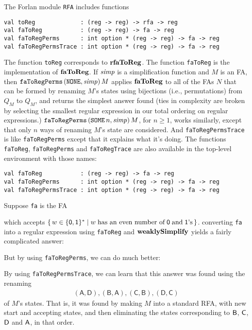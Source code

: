 The Forlan module \texttt{RFA} includes functions
\begin{verbatim}
val toReg             : (reg -> reg) -> rfa -> reg
val faToReg           : (reg -> reg) -> fa -> reg
val faToRegPerms      : int option * (reg -> reg) -> fa -> reg
val faToRegPermsTrace : int option * (reg -> reg) -> fa -> reg
\end{verbatim}
The function \texttt{toReg} corresponds to $\mathbf{rfaToReg}$.
The function \texttt{faToReg} is the implementation of $\mathbf{faToReg}$.  If
${\it simp}$ is a simplification function and $M$ is an FA, then
$\mathtt{faToRegPerms}\,(\mathtt{NONE},{\it simp})\,M$ applies $\mathbf{faToReg}$
to all of the FAs $N$ that can be formed by renaming $M$'s states
using bijections (i.e., permutations) from $Q_M$ to $Q_M$, and returns
the simplest answer found (ties in complexity are broken by selecting
the smallest regular expression in our total ordering on regular
expressions.)
$\mathtt{faToRegPerms}\,(\mathtt{SOME}\,n,{\it simp})\,M$, for $n\geq 1$,
works similarly, except that only $n$ ways of renaming $M$'s state are
considered.  And \texttt{faToRegPermsTrace} is like
\texttt{faToRegPerms} except that it explains what it's doing.  The
functions \texttt{faToReg}, \texttt{faToRegPerms} and
\texttt{faToRegTrace} are also available in the top-level environment
with those names:
\begin{verbatim}
val faToReg           : (reg -> reg) -> fa -> reg
val faToRegPerms      : int option * (reg -> reg) -> fa -> reg
val faToRegPermsTrace : int option * (reg -> reg) -> fa -> reg
\end{verbatim}

Suppose \texttt{fa} is the FA
\begin{center}

\end{center}
which accepts $\{ \, w\in\{\mathsf{0,1}\}^* \mid w\;\allowbreak\mbox{has
an even number of}\allowbreak\;\mathsf{0}\;\allowbreak\mbox{and}\allowbreak\;\mathsf{1}\allowbreak\mbox{'s}\allowbreak \, \}$.
converting \texttt{fa} into a regular expression using
\texttt{faToReg} and $\mathbf{weaklySimplify}$ yields a fairly complicated answer:

But by using \texttt{faToRegPerms}, we can do much better:

By using \texttt{faToRegPermsTrace}, we can learn that this answer was
found using the renaming
\begin{gather*}
\mathsf{(A, D), (B, A), (C, B), (D, C)}
\end{gather*}
of $M$'s states.  That is, it was found by making $M$ into
a standard RFA, with new start and accepting states,
and then eliminating the states corresponding to
$\mathsf{B}$, $\mathsf{C}$, $\mathsf{D}$ and $\mathsf{A}$, in that order.

